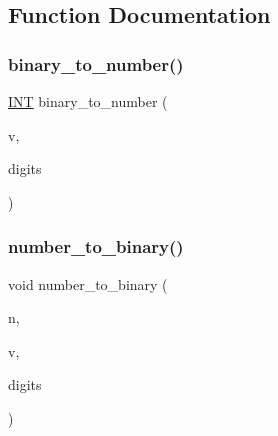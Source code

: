 \subsection{Function Documentation}
\mbox{\label{solid_8_c_a5ab5fe856186fefaed59f0cb4067d830}} 
\subsubsection{\texorpdfstring{binary\+\_\+to\+\_\+number()}{binary\_to\_number()}}
{\footnotesize\ttfamily \mbox{\hyperlink{galois_8h_a09fddde158a3a20bd2dcadb609de11dc}{I\+NT}} binary\+\_\+to\+\_\+number (\begin{DoxyParamCaption}\item[{\mbox{\hyperlink{galois_8h_a09fddde158a3a20bd2dcadb609de11dc}{I\+NT}} $\ast$}]{v,  }\item[{\mbox{\hyperlink{galois_8h_a09fddde158a3a20bd2dcadb609de11dc}{I\+NT}}}]{digits }\end{DoxyParamCaption})}

\mbox{\label{solid_8_c_a1e9e810bb113845942f7f6d2d1cfffda}} 
\subsubsection{\texorpdfstring{number\+\_\+to\+\_\+binary()}{number\_to\_binary()}}
{\footnotesize\ttfamily void number\+\_\+to\+\_\+binary (\begin{DoxyParamCaption}\item[{\mbox{\hyperlink{galois_8h_a09fddde158a3a20bd2dcadb609de11dc}{I\+NT}}}]{n,  }\item[{\mbox{\hyperlink{galois_8h_a09fddde158a3a20bd2dcadb609de11dc}{I\+NT}} $\ast$}]{v,  }\item[{\mbox{\hyperlink{galois_8h_a09fddde158a3a20bd2dcadb609de11dc}{I\+NT}}}]{digits }\end{DoxyParamCaption})}

\mbox{\label{solid_8_c_a3bb3495d21ca355a81818dd6012881eb}} 
